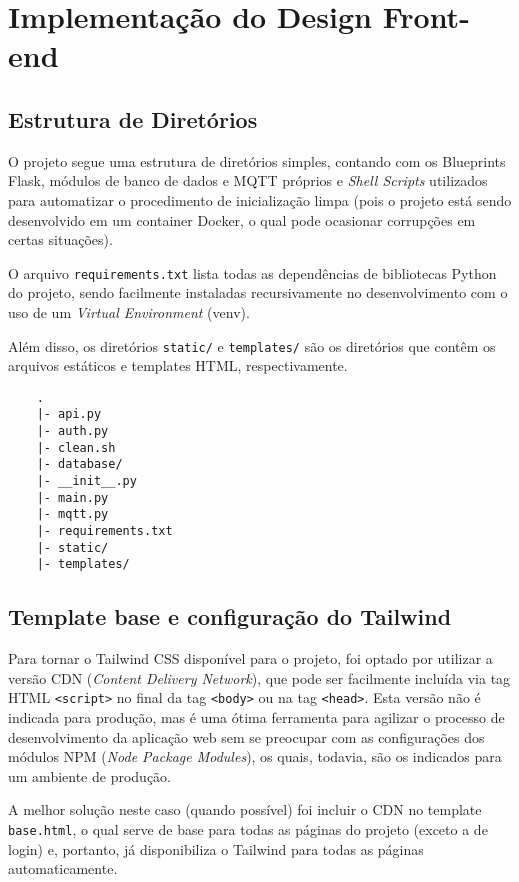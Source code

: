 \documentclass[11pt]{article}
\begin{document}
\section{Implementação do Design Front-end}

\subsection{Estrutura de Diretórios}

O projeto segue uma estrutura de diretórios simples, contando com os Blueprints Flask, módulos de banco de dados e MQTT próprios e \textit{Shell Scripts} utilizados para automatizar o procedimento de inicialização limpa (pois o projeto está sendo desenvolvido em um container Docker, o qual pode ocasionar corrupções em certas situações).

O arquivo \texttt{requirements.txt} lista todas as dependências de bibliotecas Python do projeto, sendo facilmente instaladas recursivamente no desenvolvimento com o uso de um \textit{Virtual Environment} (venv).

Além disso, os diretórios \texttt{static/} e \texttt{templates/} são os diretórios que contêm os arquivos estáticos e templates HTML, respectivamente.

\begin{verbatim}
    .
    |- api.py
    |- auth.py
    |- clean.sh
    |- database/
    |- __init__.py
    |- main.py
    |- mqtt.py
    |- requirements.txt
    |- static/
    |- templates/

\end{verbatim}

\subsection{Template base e configuração do Tailwind}

Para tornar o Tailwind CSS disponível para o projeto, foi optado por utilizar a versão CDN (\textit{Content Delivery Network}), que pode ser facilmente incluída via tag HTML \texttt{<script>} no final da tag \texttt{<body>} ou na tag \texttt{<head>}. Esta versão não é indicada para produção, mas é uma ótima ferramenta para agilizar o processo de desenvolvimento da aplicação web sem se preocupar com as configurações dos módulos NPM (\textit{Node Package Modules}), os quais, todavia, são os indicados para um ambiente de produção.

A melhor solução neste caso (quando possível) foi incluir o CDN no template \texttt{base.html}, o qual serve de base para todas as páginas do projeto (exceto a de login) e, portanto, já disponibiliza o Tailwind para todas as páginas automaticamente.
\end{document}
